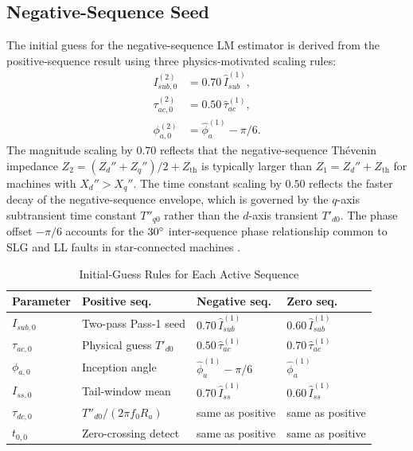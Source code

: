 \documentclass[10pt,journal,twoside]{IEEEtran}
\begin{document}
\subsection{Negative-Sequence Seed}
\label{sec:practical:seed}

The initial guess for the negative-sequence LM estimator is derived from
the positive-sequence result using three physics-motivated scaling rules:
\begin{equation}
\begin{aligned}
I_{sub,0}^{(2)} &= 0.70\,\hat{I}_{sub}^{(1)},\\[2pt]
\tau_{ac,0}^{(2)} &= 0.50\,\hat{\tau}_{ac}^{(1)},\\[2pt]
\phi_{a,0}^{(2)} &= \hat{\phi}_a^{(1)} - \pi/6.
\end{aligned}
\label{eq:seed}
\end{equation}
The magnitude scaling by $0.70$ reflects that the negative-sequence
Th\'{e}venin impedance $Z_2 = (Z_d'' + Z_q'')/2 + Z_{\mathrm{th}}$ is
typically larger than $Z_1 = Z_d'' + Z_{\mathrm{th}}$ for machines
with $X_d'' > X_q''$.  The time constant scaling by $0.50$ reflects the
faster decay of the negative-sequence envelope, which is governed by the
$q$-axis subtransient time constant $T''_{q0}$ rather than the $d$-axis
transient $T'_{d0}$.  The phase offset $-\pi/6$ accounts for the
$30\degree$ inter-sequence phase relationship common to SLG and LL faults
in star-connected machines \cite{Anderson1995}.

\begin{table}[!t]
\centering
\caption{Initial-Guess Rules for Each Active Sequence}
\label{tab:initguess}
\begin{tabular}{@{}llll@{}}
\toprule
Parameter & Positive seq. & Negative seq. & Zero seq. \\
\midrule
$I_{sub,0}$   & Two-pass Pass-1 seed & $0.70\,\hat{I}_{sub}^{(1)}$ &
  $0.60\,\hat{I}_{sub}^{(1)}$ \\
$\tau_{ac,0}$ & Physical guess $T'_{d0}$ & $0.50\,\hat{\tau}_{ac}^{(1)}$ &
  $0.70\,\hat{\tau}_{ac}^{(1)}$ \\
$\phi_{a,0}$  & Inception angle & $\hat\phi_a^{(1)} - \pi/6$ &
  $\hat\phi_a^{(1)}$ \\
$I_{ss,0}$    & Tail-window mean & $0.70\,\hat{I}_{ss}^{(1)}$ &
  $0.60\,\hat{I}_{ss}^{(1)}$ \\
$\tau_{dc,0}$ & $T''_{d0}/(2\pi f_0 R_a)$ & same as positive & same as positive \\
$t_{0,0}$     & Zero-crossing detect & same as positive & same as positive \\
\bottomrule
\end{tabular}
\end{table}
\end{document}
